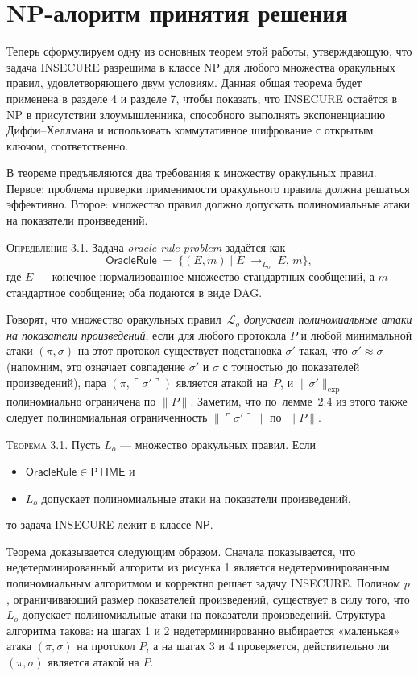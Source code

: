 \section{NP-алоритм принятия решения}

Теперь сформулируем одну из основных теорем этой работы, утверждающую, что задача \textsc{INSECURE} разрешима в классе \textsf{NP} для любого множества оракульных правил, удовлетворяющего двум условиям. Данная общая теорема будет применена в разделе 4 и разделе 7, чтобы показать, что \textsc{INSECURE} остаётся в \textsf{NP} в присутствии злоумышленника, способного выполнять экспоненциацию Диффи–Хеллмана и использовать коммутативное шифрование с открытым ключом, соответственно.

В теореме предъявляются два требования к множеству оракульных правил. Первое: проблема проверки применимости оракульного правила должна решаться эффективно. Второе: множество правил должно допускать полиномиальные атаки на показатели произведений.

\medskip
\textsc{Определение 3.1.} Задача \emph{oracle rule problem} задаётся как
\[
\mathsf{OracleRule}
\;=\;
\{(E,m)\mid E \;\to_{L_o}\; E,\,m\},
\]
где \(E\) — конечное нормализованное множество стандартных сообщений, а \(m\) — стандартное сообщение; оба подаются в виде DAG.

Говорят, что множество оракульных правил \(\mathcal{L}_o\) \emph{допускает полиномиальные атаки на показатели произведений}, если для любого протокола \(P\) и любой минимальной атаки \((\pi,\sigma)\) на этот протокол существует подстановка \(\sigma'\) такая, что $\sigma'\approx\sigma$
(напомним, это означает совпадение \(\sigma'\) и \(\sigma\) с точностью до показателей произведений), пара \((\pi,\ulcorner\sigma'\urcorner)\) является атакой на \(P\), и  $\|\sigma'\|_{\mathrm{exp}}$
полиномиально ограничена по \(\|P\|\). Заметим, что по лемме 2.4 из этого также следует полиномиальная ограниченность \(\|\ulcorner\sigma'\urcorner\|\) по \(\|P\|\).

\medskip
\textsc{Теорема 3.1.} Пусть \(L_o\) — множество оракульных правил. Если
\begin{itemize}
  \item $\mathsf{OracleRule}\in\mathsf{P}\textsf{TIME}$ и
  \item $L_o\text{ допускает полиномиальные атаки на показатели произведений},$
\end{itemize}
то задача \textsc{INSECURE} лежит в классе \(\mathsf{NP}\).

Теорема доказывается следующим образом. Сначала показывается, что недетерминированный алгоритм из рисунка 1 является недетерминированным полиномиальным алгоритмом и корректно решает задачу \textsc{INSECURE}. Полином \(p\), ограничивающий размер показателей произведений, существует в силу того, что \(L_o\) допускает полиномиальные атаки на показатели произведений. Структура алгоритма такова: на шагах 1 и 2 недетерминированно выбирается «маленькая» атака \((\pi,\sigma)\) на протокол \(P\), а на шагах 3 и 4 проверяется, действительно ли \((\pi,\sigma)\) является атакой на \(P\).

